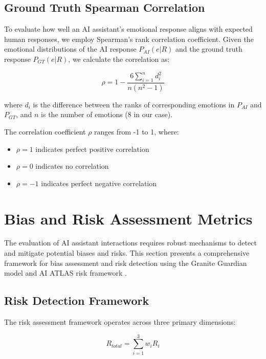 \documentclass[12pt]{article}
\begin{document}
\subsection{Ground Truth Spearman Correlation}

To evaluate how well an AI assistant's emotional response aligns with expected human responses, we employ Spearman's rank correlation coefficient. Given the emotional distributions of the AI response $P_{AI}(e|R)$ and the ground truth response $P_{GT}(e|R)$, we calculate the correlation as:

\begin{equation}
    \rho = 1 - \frac{6\sum_{i=1}^{n} d_i^2}{n(n^2-1)}
\end{equation}

where $d_i$ is the difference between the ranks of corresponding emotions in $P_{AI}$ and $P_{GT}$, and $n$ is the number of emotions (8 in our case).

The correlation coefficient $\rho$ ranges from -1 to 1, where:
\begin{itemize}
    \item $\rho = 1$ indicates perfect positive correlation
    \item $\rho = 0$ indicates no correlation
    \item $\rho = -1$ indicates perfect negative correlation
\end{itemize}

\section{Bias and Risk Assessment Metrics}

The evaluation of AI assistant interactions requires robust mechanisms to detect and mitigate potential biases and risks. This section presents a comprehensive framework for bias assessment and risk detection using the Granite Guardian model \cite{ibm2024granite} and AI ATLAS risk framework \cite{ibm2024atlas}.

\subsection{Risk Detection Framework}

The risk assessment framework operates across three primary dimensions:

\begin{equation}
    R_{total} = \sum_{i=1}^{3} w_i R_i
\end{equation}
\end{document}
